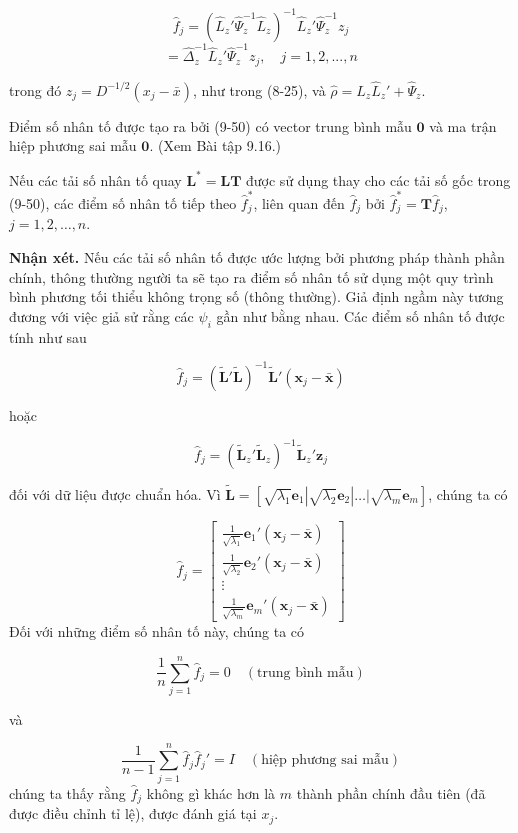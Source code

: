 \documentclass{article}
\begin{document}
\[
\hat{f}_j = (\hat{L}_z' \hat{\Psi}_z^{-1} \hat{L}_z)^{-1} \hat{L}_z' \hat{\Psi}_z^{-1} z_j
\]
\[
= \hat{\Delta}_z^{-1} \hat{L}_z' \hat{\Psi}_z^{-1} z_j, \quad j = 1,2,...,n
\]

trong đó \( z_j = D^{-1/2} (x_j - \bar{x}) \), như trong (8-25), và \(\hat{\rho} = \hat{L}_z \hat{L}_z' + \hat{\Psi}_z\).

Điểm số nhân tố được tạo ra bởi (9-50) có vector trung bình mẫu \(\mathbf{0}\) và ma trận hiệp phương sai mẫu \(\mathbf{0}\). (Xem Bài tập 9.16.)

Nếu các tải số nhân tố quay \(\mathbf{L}^* = \mathbf{L}\mathbf{T}\) được sử dụng thay cho các tải số gốc trong (9-50), các điểm số nhân tố tiếp theo \(\hat{f}_j^*\), liên quan đến \(\hat{f}_j\) bởi \(\hat{f}_j^* = \mathbf{T}\hat{f}_j\), \(j = 1, 2, \ldots, n\).

\textbf{Nhận xét.} Nếu các tải số nhân tố được ước lượng bởi phương pháp thành phần chính, thông thường người ta sẽ tạo ra điểm số nhân tố sử dụng một quy trình bình phương tối thiểu không trọng số (thông thường). Giả định ngầm này tương đương với việc giả sử rằng các \(\psi_i\) gần như bằng nhau. Các điểm số nhân tố được tính như sau

\[
\hat{f}_j = (\tilde{\mathbf{L}}'\tilde{\mathbf{L}})^{-1}\tilde{\mathbf{L}}'(\mathbf{x}_j - \bar{\mathbf{x}})
\]

hoặc

\[
\hat{f}_j = (\tilde{\mathbf{L}}_z'\tilde{\mathbf{L}}_z)^{-1}\tilde{\mathbf{L}}_z'\mathbf{z}_j
\]

đối với dữ liệu được chuẩn hóa. Vì \(\tilde{\mathbf{L}} = [\sqrt{\lambda_1} \mathbf{e}_1 | \sqrt{\lambda_2} \mathbf{e}_2 | \ldots | \sqrt{\lambda_m} \mathbf{e}_m]\), chúng ta có

\[
\hat{f}_j = \begin{bmatrix}
\frac{1}{\sqrt{\lambda_1}} \mathbf{e}_1'(\mathbf{x}_j - \bar{\mathbf{x}}) \\
\frac{1}{\sqrt{\lambda_2}} \mathbf{e}_2'(\mathbf{x}_j - \bar{\mathbf{x}}) \\
\vdots \\
\frac{1}{\sqrt{\lambda_m}} \mathbf{e}_m'(\mathbf{x}_j - \bar{\mathbf{x}})
\end{bmatrix}
\]
Đối với những điểm số nhân tố này, chúng ta có

\[
\frac{1}{n} \sum_{j=1}^{n} \hat{f}_j = 0 \quad (\text{trung bình mẫu})
\]

và

\[
\frac{1}{n - 1} \sum_{j=1}^{n} \hat{f}_j \hat{f}_j' = I \quad (\text{hiệp phương sai mẫu})
\]
chúng ta thấy rằng \(\hat{f}_j\) không gì khác hơn là \(m\) thành phần chính đầu tiên (đã được điều chỉnh tỉ lệ), được đánh giá tại \(x_j\).
\end{document}
